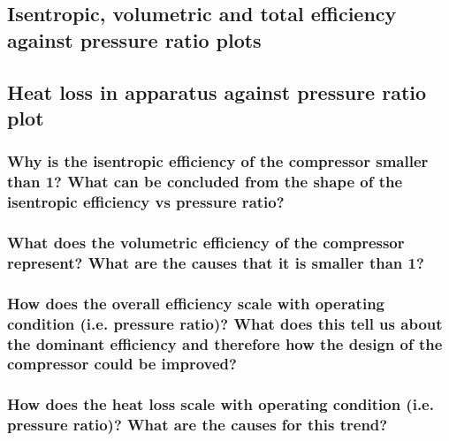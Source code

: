 \documentclass[class=article, crop=false, 12pt,a4paper]{standalone}
\numberwithin{equation}{section}
\begin{document}
\subsection{Isentropic, volumetric and total efficiency against pressure ratio plots}
\subsection{Heat loss in apparatus against pressure ratio plot}
\subsubsection{Why is the isentropic efficiency of the compressor smaller than 1? What can be concluded from the shape of the isentropic efficiency vs pressure ratio?}
\subsubsection{What does the volumetric efficiency of the compressor represent? What are the causes that it is smaller than 1?}
\subsubsection{How does the overall efficiency scale with operating condition (i.e. pressure ratio)? What does this tell us about the dominant efficiency and therefore how the design of the compressor could be improved?} 
\subsubsection{How does the heat loss scale with operating condition (i.e. pressure ratio)? What are the causes for this trend?}
\listoffigures
\end{document}
